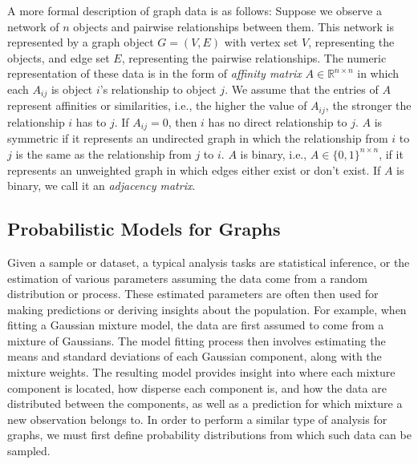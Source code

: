 \documentclass[
  11pt,
]{article}
\begin{document}
A more formal description of graph data is as follows: Suppose we
observe a network of \(n\) objects and pairwise relationships between
them. This network is represented by a graph object \(G = (V, E)\) with
vertex set \(V\), representing the objects, and edge set \(E\),
representing the pairwise relationships. The numeric representation of
these data is in the form of \emph{affinity matrix}
\(A \in \mathbb{R}^{n \times n}\) in which each \(A_{ij}\) is object
\(i\)'s relationship to object \(j\). We assume that the entries of
\(A\) represent affinities or similarities, i.e., the higher the value
of \(A_{ij}\), the stronger the relationship \(i\) has to \(j\). If
\(A_{ij} = 0\), then \(i\) has no direct relationship to \(j\). \(A\) is
symmetric if it represents an undirected graph in which the relationship
from \(i\) to \(j\) is the same as the relationship from \(j\) to \(i\).
\(A\) is binary, i.e., \(A \in \{0, 1\}^{n \times n}\), if it represents
an unweighted graph in which edges either exist or don't exist. If \(A\)
is binary, we call it an \emph{adjacency matrix}.

\hypertarget{probabilistic-models-for-graphs}{%
\subsection{Probabilistic Models for
Graphs}\label{probabilistic-models-for-graphs}}

Given a sample or dataset, a typical analysis tasks are statistical
inference, or the estimation of various parameters assuming the data
come from a random distribution or process. These estimated parameters
are often then used for making predictions or deriving insights about
the population. For example, when fitting a Gaussian mixture model, the
data are first assumed to come from a mixture of Gaussians. The model
fitting process then involves estimating the means and standard
deviations of each Gaussian component, along with the mixture weights.
The resulting model provides insight into where each mixture component
is located, how disperse each component is, and how the data are
distributed between the components, as well as a prediction for which
mixture a new observation belongs to. In order to perform a similar type
of analysis for graphs, we must first define probability distributions
from which such data can be sampled.
\end{document}
